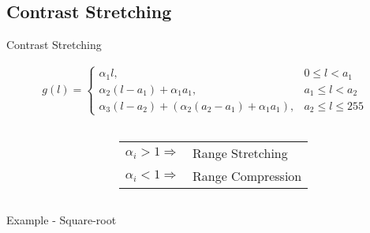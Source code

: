 \subsection{Contrast Stretching}
%
%
\begin{slide}{\hypertarget{contrast}{Contrast Stretching}}

{\small
\begin{eqnarray}
g(l)=\left\{ \begin{array}{ll}
\alpha_1 l, & 0\leq l < a_1 \\
\alpha_2 (l-a_1)+ \alpha_1 a_1, & a_1 \leq l < a_2  \\
\alpha_3 (l-a_2)+ (\alpha_2 (a_2-a_1)+\alpha_1 a_1), & a_2\leq l
\leq
255
\end{array}\right.
\end{eqnarray}
}
\begin{columns}
\begin{column}{0.6\textwidth}
\end{column}
\begin{column}{0.4\textwidth}
\scriptsize
\begin{tabular}{ll}
$\alpha_i > 1 \Rightarrow$ & Range Stretching \\
$\alpha_i < 1 \Rightarrow$ & Range Compression
\end{tabular}
\end{column}
\end{columns}

\end{slide}


%
%
\begin{slide}{Example - Square-root}
\vspace*{-16pt}
\vspace*{-22pt}
\end{slide}


